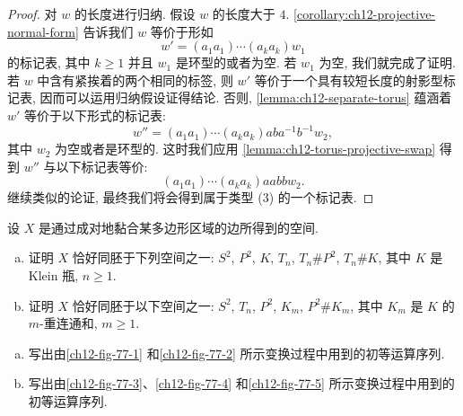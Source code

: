 \begin{proof}
对 $w$ 的长度进行归纳. 假设 $w$ 的长度大于 $4$. \cref{corollary:ch12-projective-normal-form} 告诉我们 $w$ 等价于形如
\[
w'=(a_{1}a_{1})\cdots(a_{k}a_{k})w_{1}
\]
的标记表, 其中 $k\geqslant 1$ 并且 $w_{1}$ 是环型的或者为空. 若 $w_{1}$ 为空, 我们就完成了证明. 若 $w$ 中含有紧挨着的两个相同的标签, 则 $w'$ 等价于一个具有较短长度的射影型标记表, 因而可以运用归纳假设证得结论. 否则, \cref{lemma:ch12-separate-torus} 蕴涵着 $w'$ 等价于以下形式的标记表:
\[
w''=(a_{1}a_{1})\cdots(a_{k}a_{k})aba^{-1}b^{-1}w_{2},
\]
其中 $w_{2}$ 为空或者是环型的. 这时我们应用 \cref{lemma:ch12-torus-projective-swap} 得到 $w''$ 与以下标记表等价:
\[
(a_{1}a_{1})\cdots(a_{k}a_{k})aabbw_{2}.
\]
继续类似的论证, 最终我们将会得到属于类型 (3) 的一个标记表.
\end{proof}

\begin{exercise}
\label{exercise:ch12-sec77-01}
设 $X$ 是通过成对地黏合某多边形区域的边所得到的空间.
\begin{enumerate}[(a)]
\item 证明 $X$ 恰好同胚于下列空间之一: $S^{2}$, $P^{2}$, $K$, $T_{n}$, $T_{n}\#P^{2}$, $T_{n}\#K$, 其中 $K$ 是 Klein 瓶, $n\geqslant 1$.
\item 证明 $X$ 恰好同胚于以下空间之一: $S^{2}$, $T_{n}$, $P^{2}$, $K_{m}$, $P^{2}\#K_{m}$, 其中 $K_{m}$ 是 $K$ 的 $m$-重连通和, $m\geqslant 1$.
\end{enumerate}
\end{exercise}

\begin{exercise}
\label{exercise:ch12-sec77-02}
\begin{enumerate}[(a)]
\item 写出由\cref{ch12-fig-77-1} 和\cref{ch12-fig-77-2} 所示变换过程中用到的初等运算序列.
\item 写出由\cref{ch12-fig-77-3}、\cref{ch12-fig-77-4} 和\cref{ch12-fig-77-5} 所示变换过程中用到的初等运算序列.
\end{enumerate}
\end{exercise}

